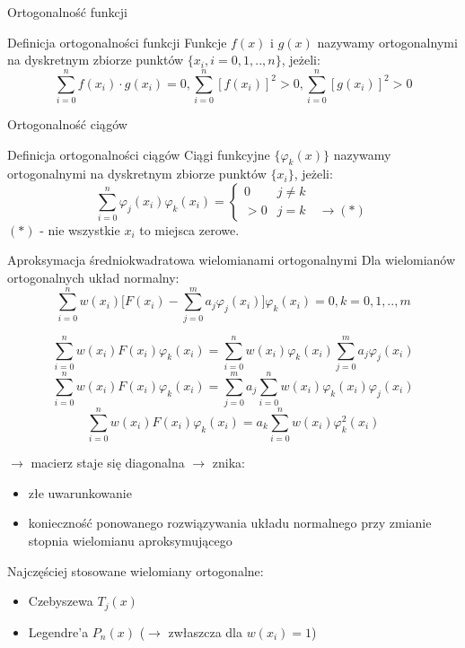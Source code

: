 \begin{frame}{Ortogonalność funkcji}
	\begin{block}{Definicja ortogonalności funkcji}
	Funkcje $f(x)$ i $g(x)$ nazywamy ortogonalnymi na dyskretnym zbiorze punktów $\{x_i,i=0,1,..,n\}$, jeżeli:
    $$\sum_{i=0}^{n}f(x_i)\cdot g(x_i) = 0, \sum_{i=0}^{n}[f(x_i)]^2 > 0,\sum_{i=0}^{n}[g(x_i)]^2 > 0$$
	\end{block}
\end{frame}
\begin{frame}{Ortogonalność ciągów}
	\begin{block}{Definicja ortogonalności ciągów}
	Ciągi funkcyjne $\{\varphi_k(x)\}$ nazywamy ortogonalnymi na dyskretnym zbiorze punktów $\{x_i\}$, jeżeli:
    $$\sum_{i=0}^{n}\varphi_j(x_i)\varphi_k(x_i) = \left\{\begin{array}{cl}
    	0 & j \not= k \\
        >0 & j = k \quad \rightarrow (*)
    \end{array}\right.$$
    $(*)$ - nie wszystkie $x_i$ to miejsca zerowe.
	\end{block}
\end{frame}
\begin{frame}{Aproksymacja średniokwadratowa wielomianami ortogonalnymi}
	Dla wielomianów ortogonalnych układ normalny:
    $$\sum_{i=0}^{n}w(x_i)\Bigg[F(x_i)-\sum_{j=0}^{m}a_j\varphi_j(x_i)\Bigg]\varphi_k(x_i)=0, k=0,1,..,m$$
    \begin{center}
    	$$\sum_{i=0}^{n}w(x_i)F(x_i)\varphi_k(x_i)=\sum_{i=0}^{n}w(x_i)\varphi_k(x_i)\sum_{j=0}^{m}a_j\varphi_j(x_i)$$\newline
        $$\sum_{i=0}^{n}w(x_i)F(x_i)\varphi_k(x_i)=\sum_{j=0}^{m}a_j\sum_{i=0}^{n}w(x_i)\varphi_k(x_i)\varphi_j(x_i)$$\newline 
        $$\sum_{i=0}^{n}w(x_i)F(x_i)\varphi_k(x_i)=a_k\sum_{i=0}^{n}w(x_i)\varphi_k^2(x_i)$$
    \end{center}
    
\end{frame}
\begin{frame}
	$\rightarrow$ macierz staje się diagonalna $\rightarrow$ znika:
    \begin{itemize}
    \item złe uwarunkowanie
    \item konieczność ponowanego rozwiązywania układu normalnego przy zmianie stopnia wielomianu aproksymującego
    \end{itemize}
	Najczęściej stosowane wielomiany ortogonalne:
    \begin{itemize}
    \item Czebyszewa $T_j(x)$
    \item Legendre'a $P_n(x)$ ($\rightarrow$ zwłaszcza dla $w(x_i) = 1$)
    \end{itemize}
\end{frame}
